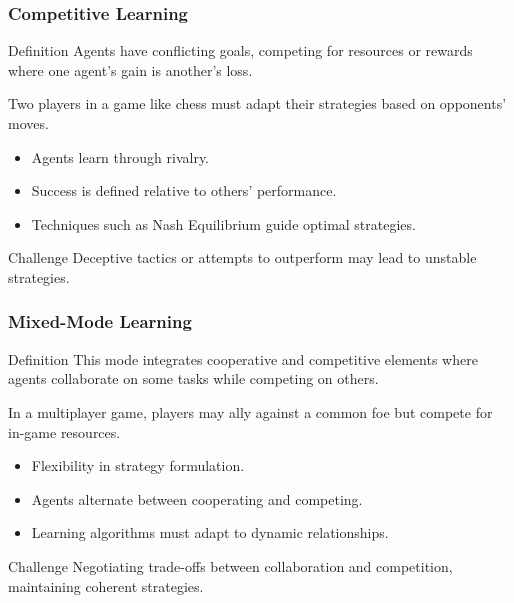 \documentclass[aspectratio=169]{beamer}
\begin{document}
\begin{frame}[fragile]
    \frametitle{Competitive Learning}
    \begin{block}{Definition}
        Agents have conflicting goals, competing for resources or rewards where one agent's gain is another's loss.
    \end{block}
    \begin{example}
        Two players in a game like chess must adapt their strategies based on opponents' moves.
    \end{example}
    \begin{itemize}
        \item Agents learn through rivalry.
        \item Success is defined relative to others’ performance.
        \item Techniques such as Nash Equilibrium guide optimal strategies.
    \end{itemize}
    \begin{block}{Challenge}
        Deceptive tactics or attempts to outperform may lead to unstable strategies.
    \end{block}
\end{frame}

\begin{frame}[fragile]
    \frametitle{Mixed-Mode Learning}
    \begin{block}{Definition}
        This mode integrates cooperative and competitive elements where agents collaborate on some tasks while competing on others.
    \end{block}
    \begin{example}
        In a multiplayer game, players may ally against a common foe but compete for in-game resources.
    \end{example}
    \begin{itemize}
        \item Flexibility in strategy formulation.
        \item Agents alternate between cooperating and competing.
        \item Learning algorithms must adapt to dynamic relationships.
    \end{itemize}
    \begin{block}{Challenge}
        Negotiating trade-offs between collaboration and competition, maintaining coherent strategies.
    \end{block}
\end{frame}
\end{document}
